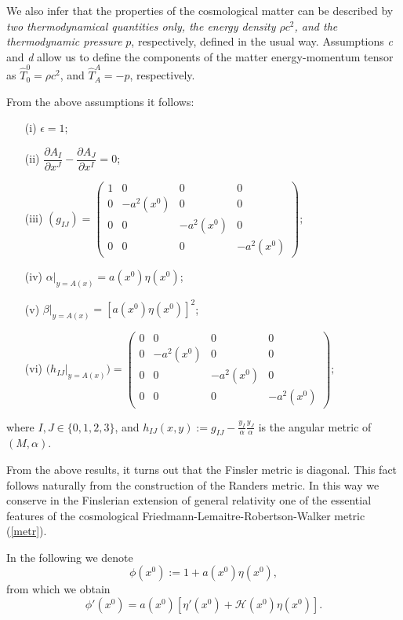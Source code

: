 \documentclass[aps,superscriptaddress, showpacs,preprintnumbers, superscriptaddress, nofootinbibt,twocolumn]{revtex4-2}
\def\be{\begin{equation}}
\def\ee{\end{equation}}
\begin{document}
We also infer that the properties of the cosmological matter can be described by {\it two thermodynamical quantities only, the energy density $\rho c^2$, and the thermodynamic pressure} $p$, respectively, defined in the usual way. Assumptions {\it c} and {\it d}  allow us to define the components of the matter energy-momentum tensor as $\hat{T}_0^0=\rho c^2$, and $\hat{T}_A^A=-p$, respectively.

From the above assumptions it follows:
\begin{enumerate}
    \item[(i)] $\epsilon=1$;
    \item[(ii)] $\dfrac{\partial A_I}{\partial x^J}-
    \dfrac{\partial A_J}{\partial x^I}=0$;
    \item[(iii)] $(g_{IJ})=\begin{pmatrix}
    1 & 0 & 0& 0\\
    0 & -a^2\left(x^0\right) & 0 & 0 \\
    0 & 0 &-a^2\left(x^0\right) & 0\\
    0 & 0 & 0 &-a^2\left(x^0\right)
    \end{pmatrix};
    $
    \item[(iv)] $\left.\alpha \right|_{y=A(x)}=a\left(x^0\right)\eta\left(x^0\right)$;
    \item[(v)] $\left.\beta \right|_{y=A(x)}=\left[a\left(x^0\right)\eta\left(x^0\right)\right]^2$;
    \item[(vi)] $\left.(h_{IJ}\right|_{y=A(x)})=\begin{pmatrix}
    0 & 0 & 0 & 0\\
    0 & -a^2\left(x^0\right) & 0 & 0 \\
    0 & 0 &-a^2\left(x^0\right) & 0\\
    0 & 0 & 0 &-a^2\left(x^0\right)
    \end{pmatrix};
    $
\end{enumerate}
where $I,J\in \{0,1,2,3\}$, and  $h_{IJ}(x,y):=g_{IJ}-\frac{y_I}{\alpha}\frac{y_J}{\alpha}$ is the angular metric of $(M,\alpha)$.

From the above results, it turns out that the Finsler metric is diagonal.  This fact follows naturally from the construction of the Randers metric. In this way we conserve in the Finslerian extension of general relativity one of the essential features of the cosmological Friedmann-Lemaitre-Robertson-Walker metric (\ref{metr}).

In the following we denote
\be
\phi \left(x^0\right):=1+a\left(x^0\right)\eta\left(x^0\right),
\ee
from  which we obtain
\be
\phi '\left(x^0\right)=a\left(x^0\right)\left[\eta '\left(x^0\right)+\mathcal{H}\left(x^0\right)\eta \left(x^0\right)\right].
\ee
\end{document}
